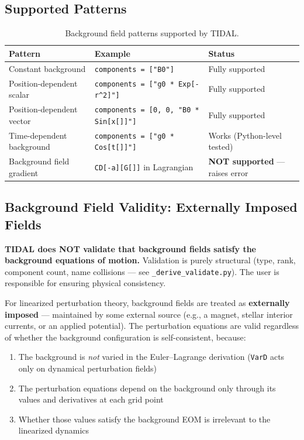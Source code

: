 \subsection{Supported Patterns}
\label{sec:bg-patterns}

\begin{table}[htbp]
\centering
\caption{Background field patterns supported by TIDAL.}
\label{tab:bg-patterns}
\begin{tabular}{@{}llp{4cm}@{}}
\toprule
Pattern & Example & Status \\
\midrule
Constant background & \texttt{components = ["B0"]} & Fully supported \\
Position-dependent scalar & \texttt{components = ["g0 * Exp[-r\^{}2]"]} & Fully supported \\
Position-dependent vector & \texttt{components = [0, 0, "B0 * Sin[x[]]"]} & Fully supported \\
Time-dependent background & \texttt{components = ["g0 * Cos[t[]]"]} & Works (Python-level tested) \\
Background field gradient & \texttt{CD[-a][G[]]} in Lagrangian & \textbf{NOT supported} --- raises error \\
\bottomrule
\end{tabular}
\end{table}

\subsection{Background Field Validity: Externally Imposed Fields}
\label{sec:bg-validity}

\textbf{TIDAL does NOT validate that background fields satisfy the background equations of
motion.} Validation is purely structural (type, rank, component count, name collisions
--- see \texttt{\_derive\_validate.py}). The user is responsible for ensuring physical consistency.

For linearized perturbation theory, background fields are treated as \textbf{externally imposed}
--- maintained by some external source (e.g., a magnet, stellar interior currents, or an
applied potential). The perturbation equations are valid regardless of whether the
background configuration is self-consistent, because:

\begin{enumerate}
  \item The background is \emph{not} varied in the Euler--Lagrange derivation (\texttt{VarD} acts only on
    dynamical perturbation fields)
  \item The perturbation equations depend on the background only through its values and
    derivatives at each grid point
  \item Whether those values satisfy the background EOM is irrelevant to the linearized dynamics
\end{enumerate}

